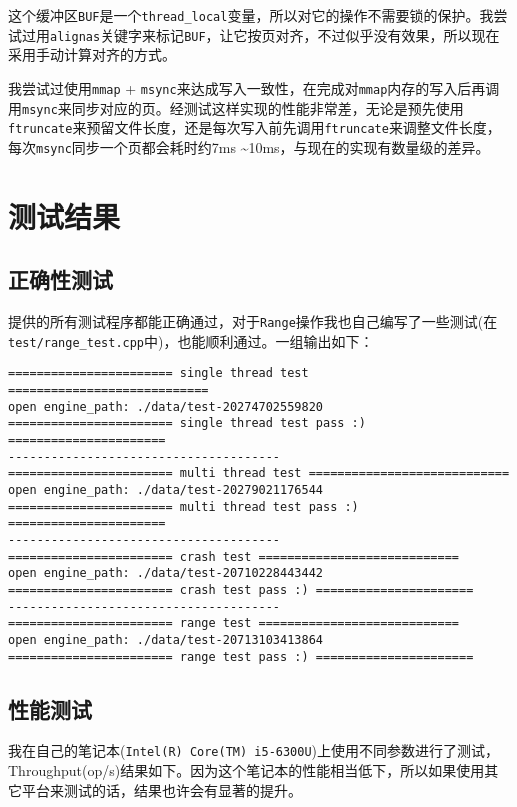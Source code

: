 \documentclass[12pt, UTF8]{article}
\begin{document}
这个缓冲区\lstinline|BUF|是一个\lstinline|thread_local|变量，所以对它的操作不需要锁的保护。我尝试过用\lstinline|alignas|关键字来标记\lstinline|BUF|，让它按页对齐，不过似乎没有效果，所以现在采用手动计算对齐的方式。

我尝试过使用\lstinline|mmap| + \lstinline|msync|来达成写入一致性，在完成对\lstinline|mmap|内存的写入后再调用\lstinline|msync|来同步对应的页。经测试这样实现的性能非常差，无论是预先使用\lstinline|ftruncate|来预留文件长度，还是每次写入前先调用\lstinline|ftruncate|来调整文件长度，每次\lstinline|msync|同步一个页都会耗时约7ms \textasciitilde 10ms，与现在的实现有数量级的差异。

\section{测试结果}

\subsection{正确性测试}

提供的所有测试程序都能正确通过，对于\lstinline|Range|操作我也自己编写了一些测试(在\lstinline|test/range_test.cpp|中)，也能顺利通过。一组输出如下：

\begin{lstlisting}
======================= single thread test ============================
open engine_path: ./data/test-20274702559820
======================= single thread test pass :) ======================
--------------------------------------
======================= multi thread test ============================
open engine_path: ./data/test-20279021176544
======================= multi thread test pass :) ======================
--------------------------------------
======================= crash test ============================
open engine_path: ./data/test-20710228443442
======================= crash test pass :) ======================
--------------------------------------
======================= range test ============================
open engine_path: ./data/test-20713103413864
======================= range test pass :) ======================
\end{lstlisting}

\subsection{性能测试}

我在自己的笔记本(\lstinline|Intel(R) Core(TM) i5-6300U|)上使用不同参数进行了测试，Throughput(op/s)结果如下。因为这个笔记本的性能相当低下，所以如果使用其它平台来测试的话，结果也许会有显著的提升。
\end{document}
